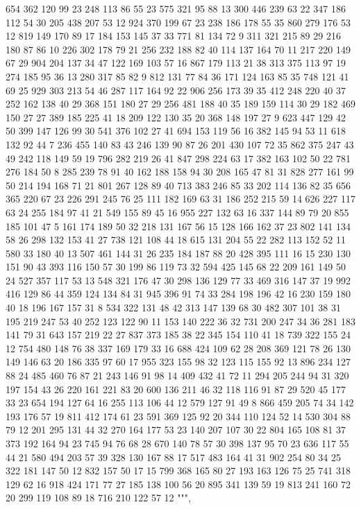 \begin{pyverbatim}
{654	362	120	99	23	248	113	86	55	23	575	321	95	88	13
300	446	239	63	22	347	186	112	54	30	205	438	207	53	12
924	370	199	67	23	238	186	178	55	35	860	279	176	53	12
819	149	170	89	17	184	153	145	37	33	771	81	134	72	9
311	321	215	89	29	216	180	87	86	10	226	302	178	79	21
256	232	188	82	40	114	137	164	70	11	217	220	149	67	29
904	204	137	34	47	122	169	103	57	16	867	179	113	21	38
313	375	113	97	19	274	185	95	36	13	280	317	85	82	9
812	131	77	84	36	171	124	163	85	35	748	121	41	69	25
929	303	213	54	46	287	117	164	92	22	906	256	173	39	35
412	248	220	40	37	252	162	138	40	29	368	151	180	27	29
256	481	188	40	35	189	159	114	30	29	182	469	150	27	27
389	185	225	41	18	209	122	130	35	20	368	148	197	27	9
623	447	129	42	50	399	147	126	99	30	541	376	102	27	41
694	153	119	56	16	382	145	94	53	11	618	132	92	44	7
236	455	140	83	43	246	139	90	87	26	201	430	107	72	35
862	375	247	43	49	242	118	149	59	19	796	282	219	26	41
847	298	224	63	17	382	163	102	50	22	781	276	184	50	8
285	239	78	91	40	162	188	158	94	30	208	165	47	81	31
828	277	161	99	50	214	194	168	71	21	801	267	128	89	40
713	383	246	85	33	202	114	136	82	35	656	365	220	67	23
226	291	245	76	25	111	182	169	63	31	186	252	215	59	14
626	227	117	63	24	255	184	97	41	21	549	155	89	45	16
955	227	132	63	16	337	144	89	79	20	855	185	101	47	5
161	174	189	50	32	218	131	167	56	15	128	166	162	37	23
802	141	134	58	26	298	132	153	41	27	738	121	108	44	18
615	131	204	55	22	282	113	152	52	11	580	33	180	40	13
507	461	144	31	26	235	184	187	88	20	428	395	111	16	15
230	130	151	90	43	393	116	150	57	30	199	86	119	73	32
594	425	145	68	22	209	161	149	50	24	527	357	117	53	13
548	321	176	47	30	298	136	129	77	33	469	316	147	37	19
992	416	129	86	44	359	124	134	84	31	945	396	91	74	33
284	198	196	42	16	230	159	180	40	18	196	167	157	31	8
534	322	131	48	42	313	147	139	68	30	482	307	101	38	31
195	219	247	53	40	252	123	122	90	11	153	140	222	36	32
731	200	247	34	36	281	183	141	79	31	643	157	219	22	27
837	373	185	38	22	345	154	110	41	18	739	322	155	24	12
754	480	148	76	38	337	169	179	33	16	688	424	109	62	28
208	369	121	78	26	130	149	146	63	20	186	335	97	60	17
955	323	155	98	32	123	115	155	92	13	896	234	127	88	24
485	460	76	87	21	243	146	91	98	14	409	432	41	72	11
294	205	244	94	31	320	197	154	43	26	220	161	221	83	20
600	136	211	46	32	118	116	91	87	29	520	45	177	33	23
654	194	127	64	16	255	113	106	44	12	579	127	91	49	8
866	459	205	74	34	142	193	176	57	19	811	412	174	61	23
591	369	125	92	20	344	110	124	52	14	530	304	88	79	12
201	295	131	44	32	270	164	177	53	23	140	207	107	30	22
804	165	108	81	37	373	192	164	94	23	745	94	76	68	28
670	140	78	57	30	398	137	95	70	23	636	117	55	44	21
580	494	203	57	39	328	130	167	88	17	517	483	164	41	31
902	254	80	34	25	322	181	147	50	12	832	157	50	17	15
799	368	165	80	27	193	163	126	75	25	741	318	129	62	16
918	424	171	77	27	185	138	100	56	20	895	341	139	59	19
813	241	160	72	20	299	119	108	89	18	716	210	122	57	12
""",

}
\end{pyverbatim}
